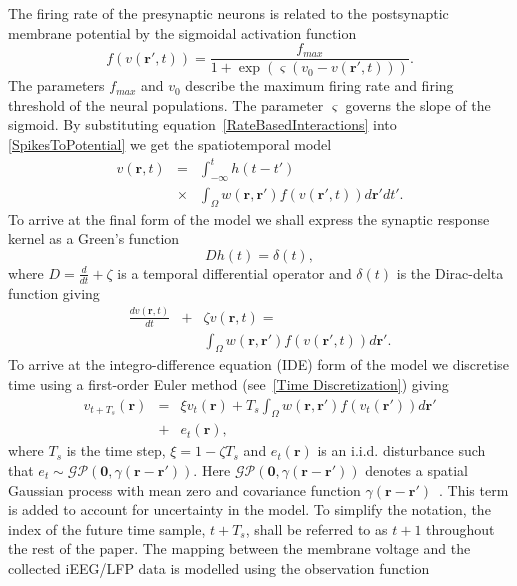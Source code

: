 \documentclass[twocolumn,11pt,a4paper]{article}		%
\begin{document}
The firing rate of the presynaptic neurons is related to the postsynaptic membrane potential by the sigmoidal activation function 
\begin{equation}
	\label{ActivationFunction} f\left( v\left( \mathbf{r}', t \right) \right) = \frac{f_{max}}{1 + \exp \left( \varsigma \left( v_0 - v\left(\mathbf{r}',t\right) \right) \right)}. 
\end{equation}
The parameters $f_{max}$ and $v_0$ describe the maximum firing rate and firing threshold of the neural populations. The parameter $\varsigma$ governs the slope of the sigmoid. By substituting equation~\ref{RateBasedInteractions} into \ref{SpikesToPotential} we get the spatiotemporal model 
\begin{eqnarray}
	\label{FullDoubleIntModel} v\left(\mathbf{r},t\right) &=&  \int_{-\infty}^t h\left(t - t'\right) \\
	&\times&\int_\Omega w\left(\mathbf{r},\mathbf{r}'\right) f\left( v\left( \mathbf{r}',t \right)\right)d\mathbf{r}'dt'. \nonumber
\end{eqnarray}
To arrive at the final form of the model we shall express the synaptic response kernel as a Green's function 
\begin{equation}
	\label{GreensFuncDef} Dh\left( t \right) = \delta \left( t \right), 
\end{equation}
where $D=\frac{d}{dt} + \zeta$ is a temporal differential operator and $\delta(t)$ is the Dirac-delta function giving 
\begin{eqnarray}
	\label{FinalFormContinuous} \frac{dv\left( \mathbf{r},t \right)}{dt} &+& \zeta v\left( \mathbf{r},t \right) = \\
	&&\int_\Omega {w\left( \mathbf{r},\mathbf{r}' \right)f\left( {v\left( \mathbf{r}',t \right)} \right)d\mathbf{r}'}. \nonumber
\end{eqnarray}
To arrive at the integro-difference equation (IDE) form of the model we discretise time using a first-order Euler method (see~\ref{Time Discretization}) giving 
\begin{eqnarray}
	\label{DiscreteTimeModel} v_{t+T_s}\left(\mathbf{r}\right) &=& \xi v_t\left(\mathbf{r}\right) + T_s \int_\Omega { w\left(\mathbf{r},\mathbf{r}'\right) f\left(v_t\left(\mathbf{r}'\right)\right) d\mathbf{r}'} \nonumber\\ 
	&+& e_t\left(\mathbf{r}\right), 
\end{eqnarray}
where $T_s$ is the time step, $\xi = 1-\zeta T_s$ and $e_t(\mathbf{r})$ is an i.i.d. disturbance such that $e_t\sim\mathcal{GP}(\mathbf 0,\gamma(\mathbf{r}-\mathbf{r}'))$. Here $\mathcal{GP}(\mathbf 0,\gamma(\mathbf{r}-\mathbf{r}'))$ denotes a spatial Gaussian process with mean zero and covariance function $\gamma(\mathbf{r}-\mathbf{r}')$~\cite{Rasmussen2005}. This term is added to account for uncertainty in the model. To simplify the notation, the index of the future time sample, $t+T_s$, shall be referred to as $t+1$ throughout the rest of the paper. The mapping between the membrane voltage and the collected iEEG/LFP data is modelled using the observation function 
\end{document}
